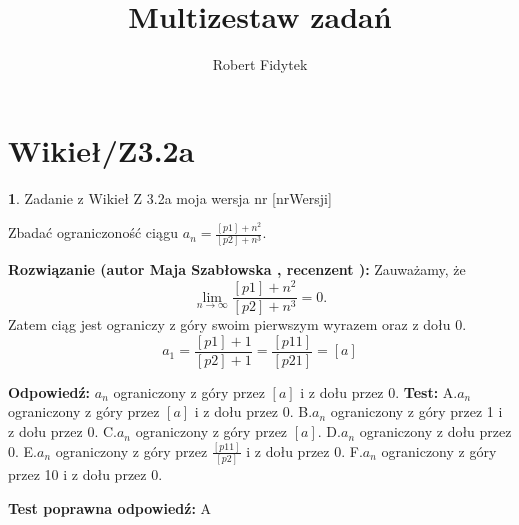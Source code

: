 \documentclass[12pt, a4paper]{article}
\title{Multizestaw zadań}
\author{Robert Fidytek}
\date{}
\theoremstyle{definition} %
\newtheorem{zad}{}
\newcommand{\kategoria}[1]{\section{#1}} %
\newcommand{\zadStart}[1]{\begin{zad}#1\newline} %
\newcommand{\zadStop}{\end{zad}}   %
\newcommand{\rozwStart}[2]{\noindent \textbf{Rozwiązanie (autor #1 , recenzent #2): }\newline} %
\newcommand{\rozwStop}{\newline}                                            %
\newcommand{\odpStart}{\noindent \textbf{Odpowiedź:}\newline}    %
\newcommand{\odpStop}{\newline}                                             %
\newcommand{\testStart}{\noindent \textbf{Test:}\newline} %
\newcommand{\testStop}{\newline} %
\newcommand{\kluczStart}{\noindent \textbf{Test poprawna odpowiedź:}\newline} %
\newcommand{\kluczStop}{\newline} %
\begin{document}
\maketitle


\kategoria{Wikieł/Z3.2a}
\zadStart{Zadanie z Wikieł Z 3.2a moja wersja nr [nrWersji]}


Zbadać ograniczoność ciągu $a_{n}=\frac{[p1]+n^{2}}{[p2]+n^{3}}$.

\zadStop

\rozwStart{Maja Szabłowska}{}
Zauważamy, że
$$\lim_{n\to\infty}\frac{[p1]+n^{2}}{[p2]+n^{3}}=0.$$
Zatem ciąg jest ograniczy z góry swoim pierwszym wyrazem oraz z dołu 0.
$$a_{1}=\frac{[p1]+1}{[p2]+1}=\frac{[p11]}{[p21]}=[a]$$

\rozwStop


\odpStart
$a_{n}$ ograniczony z góry przez $[a]$ i z dołu przez 0.
\odpStop
\testStart
A.$a_{n}$ ograniczony z góry przez $[a]$ i z dołu przez 0.
B.$a_{n}$ ograniczony z góry przez 1 i z dołu przez 0.
C.$a_{n}$ ograniczony z góry przez $[a]$.
D.$a_{n}$ ograniczony z dołu przez 0.
E.$a_{n}$ ograniczony z góry przez $\frac{[p11]}{[p2]}$ i z dołu przez 0.
F.$a_{n}$ ograniczony z góry przez 10 i z dołu przez 0.


\testStop
\kluczStart
A
\kluczStop
\end{document}
